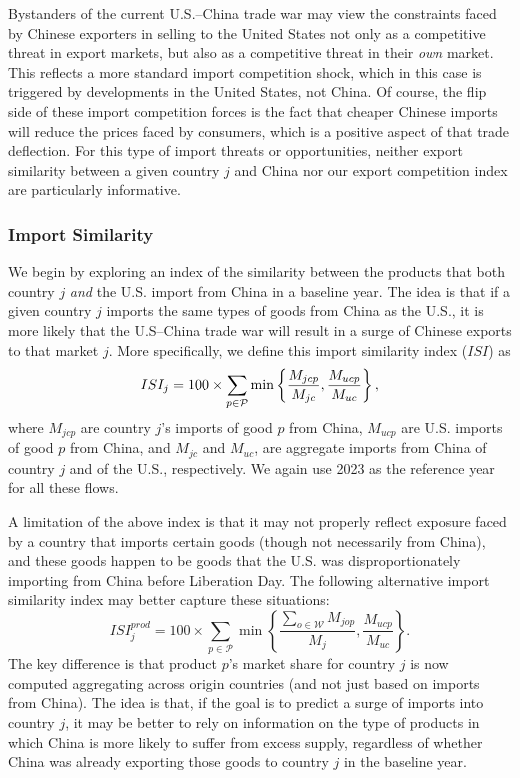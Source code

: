\documentclass[english,12pt]{article}
\theoremstyle{definition}
\begin{document}
Bystanders of the current U.S.--China trade war may view the constraints
faced by Chinese exporters in selling to the United States not only as a
competitive threat in export markets, but also as a competitive threat in
their \emph{own} market. This reflects a more standard import competition
shock, which in this case is triggered by developments in the United States,
not China. Of course, the flip side of these import competition forces is
the fact that cheaper Chinese imports will reduce the prices faced by
consumers, which is a positive aspect of that trade deflection. For this
type of import threats or opportunities, neither export similarity between a
given country $j$ and China nor our export competition index are
particularly informative.

\subsubsection*{Import Similarity}

We begin by exploring an index of the similarity between the products that
both country $j$ \emph{and} the U.S. import from China in a baseline year.
The idea is that if a given country $j$ imports the same types of goods from
China as the U.S., it is more likely that the U.S--China trade war will
result in a surge of Chinese exports to that market $j$. More specifically,
we define this import similarity index ($ISI$) as 
\begin{equation}
ISI_{j}= 100 \times \sum_{p\in \mathcal{P}}\min \left\{ \frac{M_{jcp}}{%
M_{jc}},\frac{M_{ucp}}{M_{uc}}\right\},  \label{eq: ISI Formula}
\end{equation}%
where $M_{jcp}$ are country $j$'s imports of good $p$ from China, $M_{ucp}$
are U.S. imports of good $p$ from China, and $M_{jc}$ and $M_{uc}$, are
aggregate imports from China of country $j$ and of the U.S., respectively. We
again use 2023 as the reference year for all these flows.

A limitation of the above index is that it may not properly reflect exposure
faced by a country that imports certain goods (though not necessarily from
China), and these goods happen to be goods that the U.S. was
disproportionately importing from China before Liberation Day. The following
alternative import similarity index may better capture these situations:%
\begin{equation}
ISI^{prod}_{j}= 100 \times \sum_{p\in \mathcal{P}}\min \left\{ 
\frac{\sum_{o\in \mathcal{W}}M_{jop}}{M_{j}},\frac{M_{ucp}}{M_{uc}}\right\}
.  \label{eq: ISI Alternative}
\end{equation}%
The key difference is that product $p$'s market share for country $j$ is now
computed aggregating across origin countries (and not just based on imports
from China). The idea is that, if the goal is to predict a surge of imports
into country $j$, it may be better to rely on information on the type of
products in which China is more likely to suffer from excess supply,
regardless of whether China was already exporting those goods to country $j$
in the baseline year.
\end{document}
